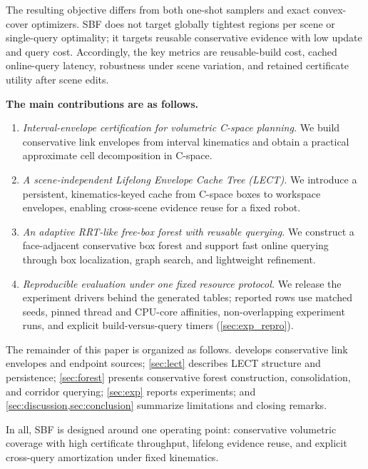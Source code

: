 \documentclass[journal]{IEEEtran}
\begin{document}
The resulting objective differs from both one-shot samplers and exact convex-cover
optimizers. SBF does not target globally tightest regions per scene or
single-query optimality; it targets reusable conservative evidence with low
update and query cost. Accordingly, the key metrics are reusable-build cost,
cached online-query latency, robustness under scene variation, and retained
certificate utility after scene edits.

\textbf{The main contributions are as follows.}
\begin{enumerate}[nosep]
  \item \emph{Interval-envelope certification for volumetric C-space planning.}
  We build conservative link envelopes from interval kinematics and obtain a
  practical approximate cell decomposition in C-space.

  \item \emph{A scene-independent Lifelong Envelope Cache Tree (LECT).}
  We introduce a persistent, kinematics-keyed cache from C-space boxes to
  workspace envelopes, enabling cross-scene evidence reuse for a fixed robot.

  \item \emph{An adaptive RRT-like free-box forest with reusable querying.}
  We construct a face-adjacent conservative box forest and support fast online
  querying through box localization, graph search, and lightweight refinement.

  \item \emph{Reproducible evaluation under one fixed resource protocol.}
  We release the experiment drivers behind the generated tables; reported rows use
  matched seeds, pinned thread and CPU-core affinities, non-overlapping experiment
  runs, and explicit build-versus-query timers (\cref{sec:exp_repro}).
\end{enumerate}

The remainder of this paper is organized as follows.
 develops conservative link envelopes and endpoint
sources; \cref{sec:lect} describes LECT structure and persistence;
\cref{sec:forest} presents conservative forest construction, consolidation, and
corridor querying; \cref{sec:exp} reports experiments; and
\cref{sec:discussion,sec:conclusion} summarize limitations and closing remarks.

In all, SBF is designed around one operating point: conservative volumetric
coverage with high certificate throughput, lifelong evidence reuse, and explicit
cross-query amortization under fixed kinematics.
\end{document}
